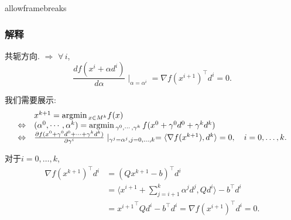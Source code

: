 \documentclass{beamer}
\begin{document}
	\begin{frame}{allowframebreaks}
		\frametitle{解释}
			
			共轭方向. $\Rightarrow$ $\forall\,i$, 
			$${\frac{d f(x^i+\alpha d^i)}{d \alpha}} \mid _{\alpha ={\alpha}^i} = {\nabla f(x^{i+1})}^{\top}d^i=0.$$
			
			我们需要展示:
			$$
			\begin{array}{cl}
				&  x^{k+1} = \textnormal{argmin}\,_{x\in M^k} f(x) \\
				\Leftrightarrow &
				(\alpha^0,\cdots,\alpha^k)
				=\textnormal{argmin}\,_{\gamma^0,\cdots,\gamma^k}\,
				f(x^0 + \gamma^0d^0 + \gamma^k d^k) \\
				\Leftrightarrow & {\frac{\partial f(x^0+{\gamma}^0 d^0+\dots+{\gamma}^k d^k)}{\partial {\gamma}^i}} \mid _{{\gamma}^j={\alpha}^j,j=0,\dots,k}=
				\langle \nabla f(x^{k+1}),d^k\rangle
				=0,\quad i = 0,\dots,k.\\
			\end{array}
			$$
			
			
			
			对于$i=0,\dots,k$,
			\begin{equation*}
				\begin{split}
					{\nabla f(x^{k+1})}^{\top}d^i&={(Qx^{k+1}-b)}^{\top}d^i\\
					&=\langle{ x^{i+1}+\sum_{j=i+1}^k {\alpha}^jd^j }, Qd^i \rangle -b^{\top}d^i\\
					&={x^{i+1}}^{\top}Qd^i-b^{\top}d^i
					={\nabla f(x^{i+1})}^{\top}d^i
					= 0.\\
				\end{split}
			\end{equation*}
		
		
		
		
	\end{frame}
	
\end{document}
